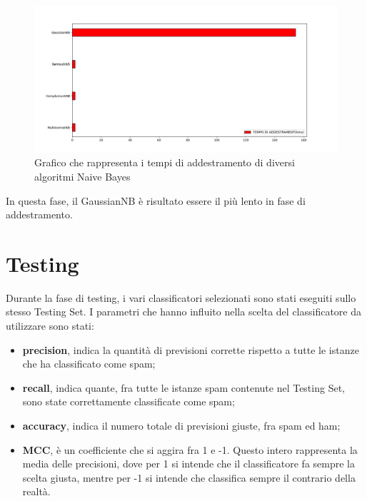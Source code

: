 \documentclass{report}
\begin{document}
    \begin{figure}[h!]
        \centering
        \includegraphics[width =\textwidth]{immagini/graficoAddestramento.png}
        \caption{Grafico che rappresenta i tempi di addestramento di diversi algoritmi Naive Bayes}

    \end{figure}

    In questa fase, il GaussianNB è risultato essere il più lento in fase di addestramento.


    
    
\newpage
    \section{Testing}
    Durante la fase di testing, i vari classificatori selezionati sono stati eseguiti sullo stesso Testing Set.
    I parametri che hanno influito nella scelta del classificatore da utilizzare sono stati:
    \begin{itemize}
        \item {\bfseries precision}, indica la quantità di previsioni corrette rispetto a tutte le istanze che ha classificato come spam;
        \item {\bfseries recall}, indica quante, fra tutte le istanze spam contenute nel Testing Set, sono state correttamente classificate come spam;
        \item {\bfseries accuracy}, indica il numero totale di previsioni giuste, fra spam ed ham;
        \item {\bfseries MCC}, è un coefficiente che si aggira fra 1 e -1. Questo intero rappresenta la media delle precisioni, dove per 1 
        si intende che il classificatore fa sempre la scelta giusta, mentre per -1 si intende che classifica sempre il contrario della realtà.  
    \end{itemize}
\end{document}
